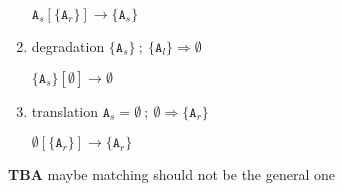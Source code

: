 \documentclass[12pt]{article}
\begin{document}
\begin{enumerate}
\hspace{1cm} $\mathtt{A}_s[\{\mathtt{A}_r\}] \rightarrow \{\mathtt{A}_s\} $

\item degradation $\{\mathtt{A}_s\}~;~\{\mathtt{A}_l\} \Rightarrow \emptyset$

\hspace{1cm} $\{\mathtt{A}_s\}[\emptyset] \rightarrow \emptyset $

\item translation $\mathtt{A}_s = \emptyset~;~\emptyset \Rightarrow \{\mathtt{A}_r\}$

\hspace{1cm} $\emptyset[\{\mathtt{A}_r\}] \rightarrow \{\mathtt{A}_r\} $

\end{enumerate}

\textbf{TBA} maybe matching should not be the general one
\end{document}

